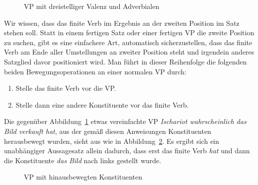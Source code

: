 \begin{figure}
  \caption{VP mit dreistelliger Valenz und Adverbialen}
  \label{fig:vgreinstelligwh}
\end{figure}

Wir wissen, dass das finite Verb im Ergebnis an der zweiten Position im Satz stehen soll.
Statt in einem fertigen Satz oder einer fertigen VP die zweite Position zu suchen, gibt es eine einfachere Art, automatisch sicherzustellen, dass das finite Verb am Ende aller Umstellungen an zweiter Position steht und irgendein anderes Satzglied davor positioniert wird.
Man führt in dieser Reihenfolge die folgenden beiden Bewegungsoperationen an einer normalen VP durch:

\begin{enumerate}\Lf
  \item Stelle das finite Verb vor die VP.
  \item Stelle dann eine andere Konstituente vor das finite Verb.
\end{enumerate}

Die gegenüber Abbildung~\ref{fig:vgreinstelligwh} etwas vereinfachte VP \textit{Ischariot wahrscheinlich das Bild verkauft hat}, aus der gemäß diesen Anweisungen Konstituenten herausbewegt wurden, sieht aus wie in Abbildung~\ref{fig:movev2}.
Es ergibt sich ein unabhängiger Aussagesatz allein dadurch, dass erst das finite Verb \textit{hat} und dann die Konstituente \textit{das Bild} nach links gestellt wurde.

\begin{figure}
  \vspace{0.3cm}
  \caption{VP mit hinausbewegten Konstituenten}
  \label{fig:movev2}
\end{figure}

